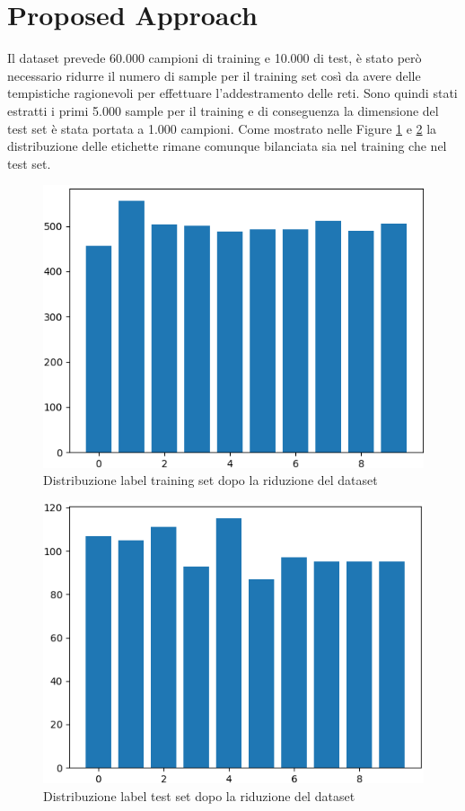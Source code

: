 \section{Proposed Approach} \label{sec:approach}
Il dataset prevede 60.000 campioni di training e 10.000 di test, è stato però necessario ridurre il numero di sample per il training set così da avere delle tempistiche ragionevoli per effettuare l'addestramento delle reti. Sono quindi stati estratti i primi 5.000 sample per il training e di conseguenza la dimensione del test set è stata portata a 1.000 campioni. Come mostrato nelle Figure \ref{fig2:train_sample_distribution} e \ref{fig3:test_sample_distribution} la distribuzione delle etichette rimane comunque bilanciata sia nel training che nel test set.
\begin{figure}[!hbt]
    \centering
    \includegraphics[width=\columnwidth]{images/train_sample_distribution2.png}
    \caption{Distribuzione label training set dopo la riduzione del dataset}
    \label{fig2:train_sample_distribution}
\end{figure}

\begin{figure}[!hbt]
    \centering
    \includegraphics[width=\columnwidth]{images/test_sample_distribution2.png}
    \caption{Distribuzione label test set dopo la riduzione del dataset}
    \label{fig3:test_sample_distribution}
\end{figure}


